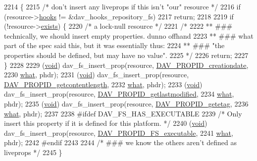 \begin{DoxyCode}
2214 \{
2215     \textcolor{comment}{/* don't insert any liveprops if this isn't "our" resource */}
2216     \textcolor{keywordflow}{if} (resource->\hyperlink{structdav__resource_a68b6668d61d787457251783e1caf4f12}{hooks} != &dav\_hooks\_repository\_fs)
2217         \textcolor{keywordflow}{return};
2218 
2219     \textcolor{keywordflow}{if} (!resource->\hyperlink{structdav__resource_acec863f4e61f4a5454c27bb41cf09324}{exists}) \{
2220         \textcolor{comment}{/* a lock-null resource */}
2221         \textcolor{comment}{/*}
2222 \textcolor{comment}{        ** ### technically, we should insert empty properties. dunno offhand}
2223 \textcolor{comment}{        ** ### what part of the spec said this, but it was essentially thus:}
2224 \textcolor{comment}{        ** ### "the properties should be defined, but may have no value".}
2225 \textcolor{comment}{        */}
2226         \textcolor{keywordflow}{return};
2227     \}
2228 
2229     (\hyperlink{group__MOD__ISAPI_gacd6cdbf73df3d9eed42fa493d9b621a6}{void}) dav\_fs\_insert\_prop(resource, \hyperlink{group__MOD__DAV_gga726ca809ffd3d67ab4b8476646f26635a3f523a6718886ade0fcb2249b8e72895}{DAV\_PROPID\_creationdate},
2230                               \hyperlink{group__MOD__DAV_ga2a369f77672da2ad7391991461733e6c}{what}, phdr);
2231     (\hyperlink{group__MOD__ISAPI_gacd6cdbf73df3d9eed42fa493d9b621a6}{void}) dav\_fs\_insert\_prop(resource, \hyperlink{group__MOD__DAV_gga726ca809ffd3d67ab4b8476646f26635a0804ca25756a42e91b6eca81b9382639}{DAV\_PROPID\_getcontentlength},
2232                               \hyperlink{group__MOD__DAV_ga2a369f77672da2ad7391991461733e6c}{what}, phdr);
2233     (\hyperlink{group__MOD__ISAPI_gacd6cdbf73df3d9eed42fa493d9b621a6}{void}) dav\_fs\_insert\_prop(resource, \hyperlink{group__MOD__DAV_gga726ca809ffd3d67ab4b8476646f26635a8f9f1ea65a7d323c3d49e50b12bc21d9}{DAV\_PROPID\_getlastmodified},
2234                               \hyperlink{group__MOD__DAV_ga2a369f77672da2ad7391991461733e6c}{what}, phdr);
2235     (\hyperlink{group__MOD__ISAPI_gacd6cdbf73df3d9eed42fa493d9b621a6}{void}) dav\_fs\_insert\_prop(resource, \hyperlink{group__MOD__DAV_gga726ca809ffd3d67ab4b8476646f26635a0984ef9eb8ae46620536251a15a80179}{DAV\_PROPID\_getetag},
2236                               \hyperlink{group__MOD__DAV_ga2a369f77672da2ad7391991461733e6c}{what}, phdr);
2237 
2238 \textcolor{preprocessor}{#ifdef DAV\_FS\_HAS\_EXECUTABLE}
2239     \textcolor{comment}{/* Only insert this property if it is defined for this platform. */}
2240     (\hyperlink{group__MOD__ISAPI_gacd6cdbf73df3d9eed42fa493d9b621a6}{void}) dav\_fs\_insert\_prop(resource, \hyperlink{repos_8c_acd0b48a95b92c0e92158c915eae82275}{DAV\_PROPID\_FS\_executable},
2241                               \hyperlink{group__MOD__DAV_ga2a369f77672da2ad7391991461733e6c}{what}, phdr);
2242 \textcolor{preprocessor}{#endif}
2243 
2244     \textcolor{comment}{/* ### we know the others aren't defined as liveprops */}
2245 \}
\end{DoxyCode}


